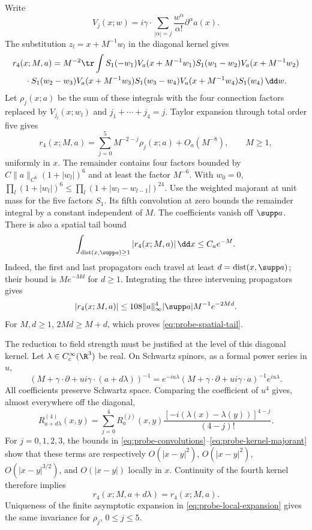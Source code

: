 \documentclass[11pt,letterpaper,reqno]{amsart}
\begin{document}
Write
\[
 V_j(x;w)=i\gamma\cdot\sum_{|\alpha|=j}
                  \frac{w^\alpha}{\alpha!}\partial^\alpha a(x).
\]
The substitution $z_l=x+M^{-1}w_l$ in the diagonal kernel gives
\begin{multline}\label{eq:probe-scaled-kernel}
 r_4(x;M,a)=M^{-2}\tr\int S_1(-w_1)V_a(x+M^{-1}w_1)
 S_1(w_1-w_2)V_a(x+M^{-1}w_2)\\
 {}\cdot S_1(w_2-w_3)V_a(x+M^{-1}w_3)
 S_1(w_3-w_4)V_a(x+M^{-1}w_4)S_1(w_4)\,\dd w.
\end{multline}
Let $\rho_j(x;a)$ be the sum of these integrals with the four
connection factors replaced by $V_{j_l}(x;w_l)$ and
$j_1+\cdots+j_4=j$. Taylor expansion through total order five gives
\begin{equation}\label{eq:probe-local-expansion}
 r_4(x;M,a)=\sum_{j=0}^5M^{-2-j}\rho_j(x;a)+O_a(M^{-8}),
 \qquad M\ge1,
\end{equation}
uniformly in $x$. The remainder contains four factors bounded by
$C\|a\|_{C^6}(1+|w_l|)^6$ and at least the factor $M^{-6}$.
With $w_0=0$,
$\prod_l(1+|w_l|)^6\le\prod_l(1+|w_l-w_{l-1}|)^{24}$.
Use the weighted majorant at unit mass for the five factors $S_1$.
Its fifth convolution at zero bounds the remainder integral by a
constant independent of $M$.
The coefficients vanish off $\supp a$. There is also a spatial tail
bound
\begin{equation}\label{eq:probe-spatial-tail}
 \int_{\operatorname{dist}(x,\supp a)\ge1}|r_4(x;M,a)|\,\dd x
 \le C_ae^{-M}.
\end{equation}
Indeed, the first and last propagators each travel at least
$d=\operatorname{dist}(x,\supp a)$; their bound is $Me^{-Md}$ for
$d\ge1$. Integrating the three intervening propagators gives
\[
 |r_4(x;M,a)|\le108\|a\|_\infty^4|\supp a|M^{-1}e^{-2Md}.
\]
For $M,d\ge1$, $2Md\ge M+d$, which proves
\eqref{eq:probe-spatial-tail}.

The reduction to field strength must be justified at the level of this
diagonal kernel. Let $\lambda\in C_c^\infty(\R^3)$ be real. On Schwartz
spinors, as a formal power series in $u$,
\[
 (M+\gamma\cdot\partial+ui\gamma\cdot(a+d\lambda))^{-1}
 =e^{-iu\lambda}(M+\gamma\cdot\partial+ui\gamma\cdot a)^{-1}
                       e^{iu\lambda}.
\]
All coefficients preserve Schwartz space. Comparing the coefficient
of $u^4$ gives, almost everywhere off the diagonal,
\begin{equation}\label{eq:probe-gauge-kernel}
 R_{a+d\lambda}^{(4)}(x,y)=\sum_{j=0}^4R_a^{(j)}(x,y)
       \frac{[-i(\lambda(x)-\lambda(y))]^{4-j}}{(4-j)!}.
\end{equation}
For $j=0,1,2,3$, the bounds in
\eqref{eq:probe-convolutions}--\eqref{eq:probe-kernel-majorant} show
that these terms are respectively $O(|x-y|^2)$,
$O(|x-y|^2)$, $O(|x-y|^{3/2})$, and $O(|x-y|)$ locally in $x$.
Continuity of the fourth kernel therefore implies
\[
 r_4(x;M,a+d\lambda)=r_4(x;M,a).
\]
Uniqueness of the finite asymptotic expansion in
\eqref{eq:probe-local-expansion} gives the same invariance for
$\rho_j$, $0\le j\le5$.
\end{document}
